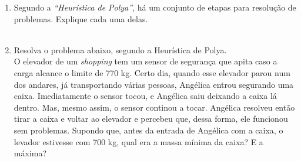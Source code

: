 \documentclass[a4paper, 12pt]{article}
\begin{document}
\begin{enumerate}
\item Segundo a \emph{``Heurística de Polya''}, há um conjunto de etapas para resolução de problemas. Explique cada uma delas. \\ \\

\item Resolva o problema abaixo, segundo a Heurística de Polya. \\
  O elevador de um \textit{shopping} tem um sensor de segurança que apita caso a carga alcance o limite de 770 kg. Certo dia, quando esse elevador parou num dos andares, já transportando várias pessoas, Angélica entrou segurando uma caixa. Imediatamente o sensor tocou, e Angélica saiu deixando a caixa lá dentro. Mas, mesmo assim, o sensor continou a tocar. Angélica resolveu então tirar a caixa e voltar ao elevador e percebeu que, dessa forma, ele funcionou sem problemas. Supondo que, antes da entrada de Angélica com a caixa, o levador estivesse com 700 kg, qual era a massa mínima da caixa? E a máxima?
 
\end{enumerate}
\end{document}
